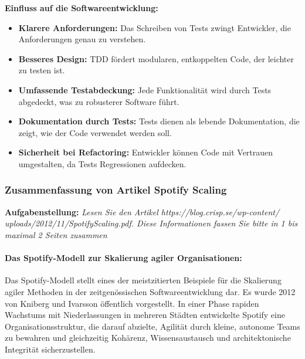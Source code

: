 \textbf{Einfluss auf die Softwareentwicklung:}
\begin{itemize}
    \item \textbf{Klarere Anforderungen:} Das Schreiben von Tests zwingt Entwickler, die Anforderungen genau zu verstehen.
    \item \textbf{Besseres Design:} TDD fördert modularen, entkoppelten Code, der leichter zu testen ist.
    \item \textbf{Umfassende Testabdeckung:} Jede Funktionalität wird durch Tests abgedeckt, was zu robusterer Software führt.
    \item \textbf{Dokumentation durch Tests:} Tests dienen als lebende Dokumentation, die zeigt, wie der Code verwendet werden soll.
    \item \textbf{Sicherheit bei Refactoring:} Entwickler können Code mit Vertrauen umgestalten, da Tests Regressionen aufdecken.
\end{itemize}





\subsubsection{Zusammenfassung von Artikel Spotify Scaling}
\textbf{Aufgabenstellung:} \textit{Lesen Sie den Artikel https://blog.crisp.se/wp-content/ \\
uploads/2012/11/SpotifyScaling.pdf.
Diese Informationen fassen Sie bitte in 1 bis maximal 2 Seiten zusammen}

\paragraph{Das Spotify-Modell zur Skalierung agiler Organisationen:}
Das Spotify-Modell stellt eines der meistzitierten Beispiele für die Skalierung agiler Methoden in der zeitgenössischen Softwareentwicklung dar.
Es wurde 2012 von Kniberg und Ivarsson öffentlich vorgestellt. In einer Phase rapiden Wachstums mit Niederlassungen
in mehreren Städten entwickelte Spotify eine Organisationsstruktur, die darauf abzielte, Agilität durch kleine,
autonome Teams zu bewahren und gleichzeitig Kohärenz, Wissensaustausch und architektonische Integrität sicherzustellen.

